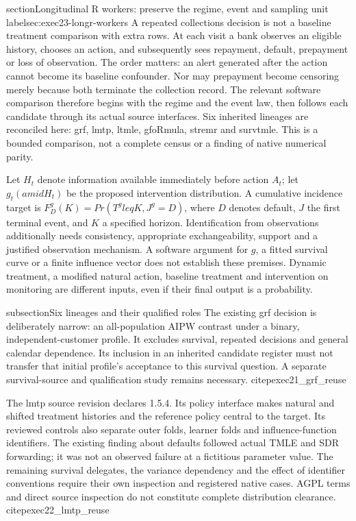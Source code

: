 
section{Longitudinal R workers: preserve the regime, event and sampling unit}
label{sec:exec23-longr-workers}
A repeated collections decision is not a baseline treatment comparison with
extra rows. At each visit a bank observes an eligible history, chooses an
action, and subsequently sees repayment, default, prepayment or loss of
observation. The order matters: an alert generated after the action cannot
become its baseline confounder. Nor may prepayment become censoring merely
because both terminate the collection record. The relevant software comparison
therefore begins with the regime and the event law, then follows each candidate
through its actual source interfaces. Six inherited lineages are reconciled
here: grf, lmtp, ltmle, gfoRmula, stremr and survtmle. This is a bounded comparison,
not a complete census or a finding of native numerical parity.

Let $H_t$ denote information available immediately before action $A_t$; let
$g_t(amid H_t)$ be the proposed intervention distribution. A cumulative
incidence target is $F_D^g(K)=Pr(T^gleq K,J^g=D)$, where $D$ denotes default,
$J$ the first terminal event, and $K$ a specified horizon. Identification from
observations additionally needs consistency, appropriate exchangeability,
support and a justified observation mechanism. A software argument for
$g$, a fitted survival curve or a finite influence vector does not establish
these premises. Dynamic treatment, a modified natural action, baseline
treatment and intervention on monitoring are different inputs, even if their
final output is a probability.

subsection{Six lineages and their qualified roles}
The existing grf decision is deliberately narrow: an all-population AIPW
contrast under a binary, independent-customer profile. It excludes survival,
repeated decisions and general calendar dependence. Its inclusion in an
inherited candidate register must not transfer that initial profile's
acceptance to this survival question. A separate survival-source and
qualification study remains necessary. citep{exec21_grf_reuse}

The lmtp source revision declares 1.5.4. Its policy interface makes natural
and shifted treatment histories and the reference policy central to the
target. Its reviewed controls also separate outer folds, learner folds and
influence-function identifiers. The existing finding about defaults followed
actual TMLE and SDR forwarding; it was not an observed failure at a fictitious
parameter value. The remaining survival delegates, the variance dependency
and the effect of identifier conventions require their own inspection and
registered native cases. AGPL terms and direct source inspection do not
constitute complete distribution clearance. citep{exec22_lmtp_reuse}

